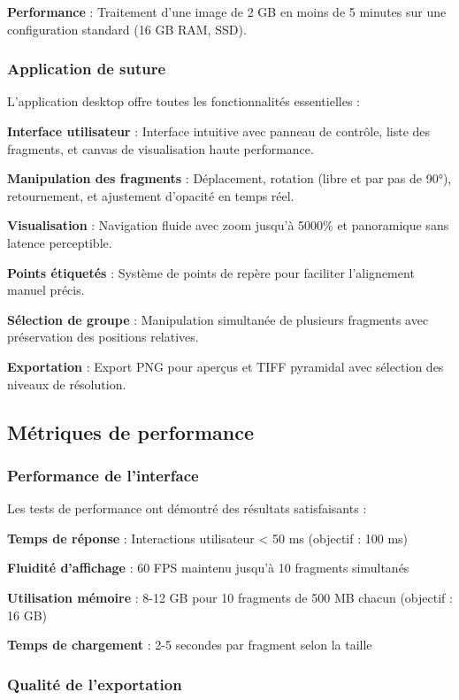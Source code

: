 \documentclass[12pt,a4paper]{report}
\begin{document}
\textbf{Performance} : Traitement d'une image de 2 GB en moins de 5 minutes sur une configuration standard (16 GB RAM, SSD).

\subsubsection{Application de suture}

L'application desktop offre toutes les fonctionnalités essentielles :

\textbf{Interface utilisateur} : Interface intuitive avec panneau de contrôle, liste des fragments, et canvas de visualisation haute performance.

\textbf{Manipulation des fragments} : Déplacement, rotation (libre et par pas de 90°), retournement, et ajustement d'opacité en temps réel.

\textbf{Visualisation} : Navigation fluide avec zoom jusqu'à 5000\% et panoramique sans latence perceptible.

\textbf{Points étiquetés} : Système de points de repère pour faciliter l'alignement manuel précis.

\textbf{Sélection de groupe} : Manipulation simultanée de plusieurs fragments avec préservation des positions relatives.

\textbf{Exportation} : Export PNG pour aperçus et TIFF pyramidal avec sélection des niveaux de résolution.

\subsection{Métriques de performance}

\subsubsection{Performance de l'interface}

Les tests de performance ont démontré des résultats satisfaisants :

\textbf{Temps de réponse} : Interactions utilisateur < 50 ms (objectif : 100 ms)

\textbf{Fluidité d'affichage} : 60 FPS maintenu jusqu'à 10 fragments simultanés

\textbf{Utilisation mémoire} : 8-12 GB pour 10 fragments de 500 MB chacun (objectif : 16 GB)

\textbf{Temps de chargement} : 2-5 secondes par fragment selon la taille

\subsubsection{Qualité de l'exportation}
\end{document}

